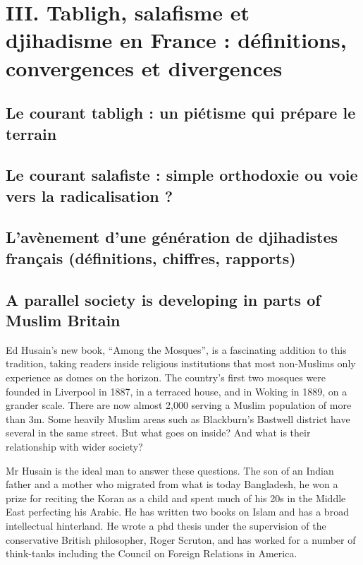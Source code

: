 
\chapter{III. Tabligh, salafisme et djihadisme en France : définitions, convergences et
divergences}

\section{ Le courant tabligh : un piétisme qui prépare le terrain}



\section{Le courant salafiste : simple orthodoxie ou voie vers la radicalisation ?}




\section{ L’avènement d’une génération de djihadistes français (définitions, chiffres,
rapports)}




\section{A parallel society is developing in parts of Muslim Britain}


Ed Husain’s new book, “Among the Mosques”, is a fascinating addition to this tradition, taking readers inside religious institutions that most non-Muslims only experience as domes on the horizon. The country’s first two mosques were founded in Liverpool in 1887, in a terraced house, and in Woking in 1889, on a grander scale. There are now almost 2,000 serving a Muslim population of more than 3m. Some heavily Muslim areas such as Blackburn’s Bastwell district have several in the same street. But what goes on inside? And what is their relationship with wider society?

Mr Husain is the ideal man to answer these questions. The son of an Indian father and a mother who migrated from what is today Bangladesh, he won a prize for reciting the Koran as a child and spent much of his 20s in the Middle East perfecting his Arabic. He has written two books on Islam and has a broad intellectual hinterland. He wrote a phd thesis under the supervision of the conservative British philosopher, Roger Scruton, and has worked for a number of think-tanks including the Council on Foreign Relations in America.


